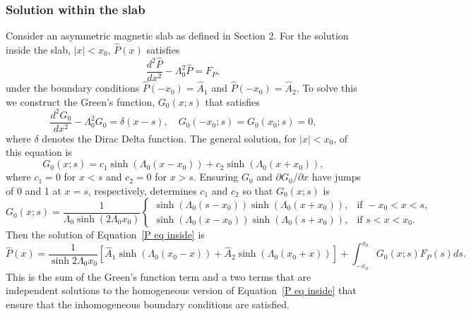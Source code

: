 \documentclass{aastex61}
\begin{document}
\subsubsection{Solution within the slab}
Consider an asymmetric magnetic slab as defined in Section 2. For the solution inside the slab, $|x| < x_0$, $\hat{P}(x)$ satisfies
\begin{equation}
\frac{d^2\hat{P}}{dx^2} - \Lambda_0^2 \hat{P} = F_P,
\label{P eq inside}
\end{equation}
under the boundary conditions $\hat{P}(-x_0) = \hat{A}_1$ and $\hat{P}(-x_0) = \hat{A}_2$. To solve this we construct the Green's function, $G_0(x;s)$ that satisfies
\begin{equation}
\frac{d^2G_0}{dx^2} - \Lambda_0^2 G_0 = \delta(x-s), \quad G_0(-x_0;s) = G_0(x_0;s) = 0,
\end{equation}
where $\delta$ denotes the Dirac Delta function. The general solution, for $|x| < x_0$, of this equation is
\begin{equation}
G_0(x;s) = c_1\sinh(\Lambda_0(x - x_0)) + c_2\sinh(\Lambda_0(x + x_0)),
\end{equation}
where $c_1 = 0$ for $x < s$ and $c_2 = 0$ for $x > s$. Ensuring $G_0$ and $\partial G_0 / \partial x$ have jumps of 0 and 1 at $x = s$, respectively, determines $c_1$ and $c_2$ so that $G_0(x;s)$ is
\begin{equation}
G_0(x;s) = \frac{1}{\Lambda_0\sinh(2\Lambda_0 x_0)}
\begin{cases}
\sinh(\Lambda_0(s - x_0))\sinh(\Lambda_0(x + x_0)), & \text{if } -x_0<x<s, \\
\sinh(\Lambda_0(x - x_0))\sinh(\Lambda_0(s + x_0)), & \text{if } s<x<x_0.
\end{cases}
\end{equation}
Then the solution of Equation~\eqref{P eq inside} is
\begin{equation}
\hat{P}(x) = \frac{1}{\sinh{2\Lambda_0x_0}} \left[ \hat{A}_1\sinh(\Lambda_0(x_0 - x)) + \hat{A}_2\sinh(\Lambda_0(x_0 + x)) \right] + \int_{-x_0}^{x_0} G_0(x;s) F_P(s) ds.
\label{P sol 0}
\end{equation}
This is the sum of the Green's function term and a two terms that are independent solutions to the homogeneous version of Equation~\eqref{P eq inside} that ensure that the inhomogeneous boundary conditions are satisfied.
\end{document}
